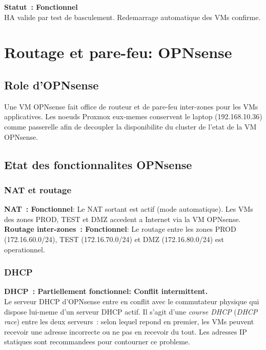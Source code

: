 \documentclass[a4paper,11pt]{article}
\newenvironment{warnbox}{%
  \begin{mdframed}[linecolor=orange,backgroundcolor=orange!8,linewidth=1pt,
    leftmargin=0pt,rightmargin=0pt,innertopmargin=6pt,innerbottommargin=6pt]
}{%
  \end{mdframed}
}
\newenvironment{successbox}{%
  \begin{mdframed}[linecolor=vert,backgroundcolor=vert!7,linewidth=1pt,
    leftmargin=0pt,rightmargin=0pt,innertopmargin=6pt,innerbottommargin=6pt]
}{%
  \end{mdframed}
}
\begin{document}
\begin{successbox}
  \textbf{Statut~: Fonctionnel} \\
  HA valide par test de basculement. Redemarrage automatique des VMs confirme.
\end{successbox}

\section{Routage et pare-feu: OPNsense}

\subsection{Role d'OPNsense}

Une VM OPNsense fait office de routeur et de pare-feu inter-zones pour les VMs
applicatives. Les noeuds Proxmox eux-memes conservent le laptop (192.168.10.36)
comme passerelle afin de decoupler la disponibilite du cluster de l'etat de la
VM OPNsense.

\subsection{Etat des fonctionnalites OPNsense}

\subsubsection{NAT et routage}

\begin{successbox}
  \textbf{NAT~: Fonctionnel}: Le NAT sortant est actif (mode automatique).
  Les VMs des zones PROD, TEST et DMZ acce\-dent a Internet via la VM OPNsense.\\[0.3em]
  \textbf{Routage inter-zones~: Fonctionnel}: Le routage entre les zones PROD (172.16.60.0/24),
  TEST (172.16.70.0/24) et DMZ (172.16.80.0/24) est operationnel.
\end{successbox}

\subsubsection{DHCP}

\begin{warnbox}
  \textbf{DHCP~: Partiellement fonctionnel: Conflit intermittent.}\\
  Le serveur DHCP d'OPNsense entre en conflit avec le commutateur physique
  qui dispose lui-meme d'un serveur DHCP actif. Il s'agit d'une \textit{course DHCP}
  (\textit{DHCP race}) entre les deux serveurs~: selon lequel repond en premier,
  les VMs peuvent recevoir une adresse incorrecte ou ne pas en recevoir du tout.
  Les adresses IP statiques sont recommandees pour contourner ce probleme.
\end{warnbox}
\end{document}

